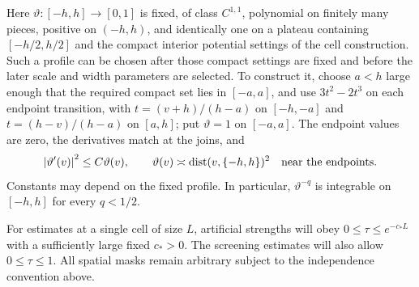 Here $\vartheta:[-h,h]\to[0,1]$ is fixed, of class $C^{1,1}$, polynomial
on finitely many pieces, positive on $(-h,h)$, and identically one on
a plateau containing $[-h/2,h/2]$ and the compact interior potential
settings of the cell construction. Such a profile can be chosen after
those compact settings are fixed and before the later scale and width
parameters are selected. To construct it, choose $a<h$ large enough
that the required compact set lies in $[-a,a]$, and use
$3t^2-2t^3$ on each endpoint transition, with
$t=(v+h)/(h-a)$ on $[-h,-a]$ and $t=(h-v)/(h-a)$ on $[a,h]$; put
$\vartheta=1$ on $[-a,a]$. The endpoint values are zero, the derivatives
match at the joins, and
\begin{equation}
 \left\lvert\vartheta'(v)\right\rvert^2\le C\vartheta(v),\qquad
 \vartheta(v)\asymp\operatorname{dist}(v,\{-h,h\})^2
 \quad\hbox{near the endpoints}.
 \label{mat:profile-properties}
\end{equation}
Constants may depend on the fixed profile. In particular,
$\vartheta^{-q}$ is integrable on $[-h,h]$ for every $q<1/2$.

For estimates at a single cell of size $L$, artificial strengths will
obey $0\le\tau\le e^{-c_*L}$ with a sufficiently large fixed $c_*>0$.
The screening estimates will also allow $0\le\tau\le1$. All spatial
masks remain arbitrary subject to the independence convention above.
